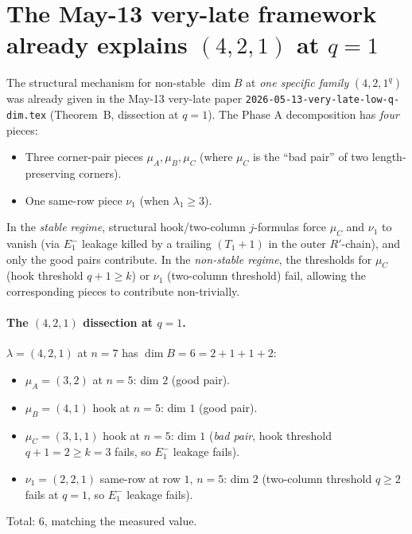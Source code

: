 \documentclass[11pt]{article}
\theoremstyle{definition}
\begin{document}
\section{The May-13 very-late framework already explains $(4, 2, 1)$ at $q = 1$}
\label{sec:may13-framework}

The structural mechanism for non-stable $\dim B$ at \emph{one specific
family} $(4, 2, 1^q)$ was already given in the May-13 very-late paper
\texttt{2026-05-13-very-late-low-q-dim.tex} (Theorem~B, dissection at
$q = 1$).  The Phase A decomposition has \emph{four} pieces:

\begin{itemize}[topsep=0.3em,itemsep=0.2em]
\item Three corner-pair pieces $\mu_A, \mu_B, \mu_C$ (where
$\mu_C$ is the ``bad pair'' of two length-preserving corners).
\item One same-row piece $\nu_1$ (when $\lambda_1 \ge 3$).
\end{itemize}

In the \emph{stable regime}, structural hook/two-column $j$-formulas
force $\mu_C$ and $\nu_1$ to vanish (via $E_1^-$ leakage killed by a
trailing $(T_1{+}1)$ in the outer $R'$-chain), and only the good pairs
contribute.  In the \emph{non-stable regime}, the thresholds for $\mu_C$
(hook threshold $q + 1 \ge k$) or $\nu_1$ (two-column threshold) fail,
allowing the corresponding pieces to contribute non-trivially.

\paragraph{The $(4, 2, 1)$ dissection at $q = 1$.}
$\lambda = (4, 2, 1)$ at $n = 7$ has $\dim B = 6 = 2 + 1 + 1 + 2$:
\begin{itemize}[topsep=0.3em,itemsep=0.2em]
\item $\mu_A = (3, 2)$ at $n = 5$: dim $2$ (good pair).
\item $\mu_B = (4, 1)$ hook at $n = 5$: dim $1$ (good pair).
\item $\mu_C = (3, 1, 1)$ hook at $n = 5$: dim $1$ (\emph{bad pair},
hook threshold $q + 1 = 2 \ge k = 3$ fails, so $E_1^-$ leakage fails).
\item $\nu_1 = (2, 2, 1)$ same-row at row $1$, $n = 5$: dim $2$
(two-column threshold $q \ge 2$ fails at $q = 1$, so $E_1^-$ leakage
fails).
\end{itemize}

Total: $6$, matching the measured value.
\end{document}
